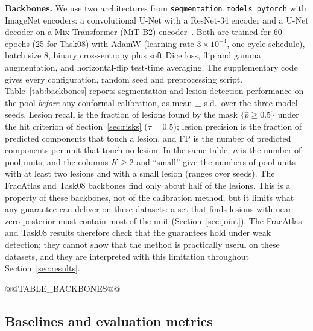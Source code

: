 \documentclass[sn-mathphys-num]{sn-jnl}%
\theoremstyle{thmstyleone}
\theoremstyle{thmstyletwo}
\theoremstyle{thmstylethree}
\newcommand{\1}{\mathbb{1}}
\begin{document}
\textbf{Backbones.} We use two architectures from \texttt{segmentation\_models\_pytorch} with ImageNet encoders: a convolutional U-Net with a ResNet-34 encoder and a U-Net decoder on a Mix Transformer (MiT-B2) encoder~\cite{xie2021segformer}. Both are trained for 60 epochs (25 for Task08) with AdamW (learning rate $3\times10^{-4}$, one-cycle schedule), batch size 8, binary cross-entropy plus soft Dice loss, flip and gamma augmentation, and horizontal-flip test-time averaging. The supplementary code gives every configuration, random seed and preprocessing script. Table~\ref{tab:backbones} reports segmentation and lesion-detection performance on the pool \emph{before} any conformal calibration, as mean $\pm$ s.d.\ over the three model seeds. Lesion recall is the fraction of lesions found by the mask $\{\hat p\ge0.5\}$ under the hit criterion of Section~\ref{sec:risks} ($\tau=0.5$); lesion precision is the fraction of predicted components that touch a lesion, and FP is the number of predicted components per unit that touch no lesion. In the same table, $n$ is the number of pool units, and the columns $K\geq2$ and ``small'' give the numbers of pool units with at least two lesions and with a small lesion (ranges over seeds). The FracAtlas and Task08 backbones find only about half of the lesions. This is a property of these backbones, not of the calibration method, but it limits what any guarantee can deliver on these datasets: a set that finds lesions with near-zero posterior must contain most of the unit (Section~\ref{sec:joint}). The FracAtlas and Task08 results therefore check that the guarantees hold under weak detection; they cannot show that the method is practically useful on these datasets, and they are interpreted with this limitation throughout Section~\ref{sec:results}.

@@TABLE_BACKBONES@@

\subsection{Baselines and evaluation metrics}\label{sec:baselines}
\end{document}
